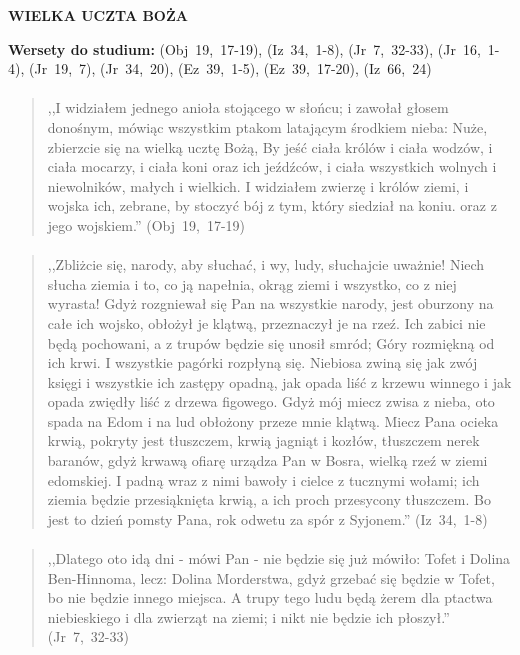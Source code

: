 \documentclass[10pt,a4paper,oneside]{article}
\begin{document}
\centerline{\textbf{\MakeUppercase{Wielka uczta Boża}}}
\begin{center}
\textbf{Wersety do studium:} 
\mbox{(Obj 19, 17-19)}, \mbox{(Iz 34, 1-8)}, \mbox{(Jr 7, 32-33)}, \mbox{(Jr 16, 1-4)}, \mbox{(Jr 19, 7)}, \mbox{(Jr 34, 20)}, \mbox{(Ez 39, 1-5)}, \mbox{(Ez 39, 17-20)}, \mbox{(Iz 66, 24)}
\end{center}
\paragraph{}
\begin{quote}
,,I widziałem jednego anioła stojącego w słońcu; i zawołał głosem donośnym, mówiąc wszystkim ptakom latającym środkiem nieba: Nuże, zbierzcie się na wielką ucztę Bożą, By jeść ciała królów i ciała wodzów, i ciała mocarzy, i ciała koni oraz ich jeźdźców, i ciała wszystkich wolnych i niewolników, małych i wielkich. I widziałem zwierzę i królów ziemi, i wojska ich, zebrane, by stoczyć bój z tym, który siedział na koniu. oraz z jego wojskiem.'' \mbox{(Obj 19, 17-19)}
\end{quote}
\paragraph{}
\begin{quote}
,,Zbliżcie się, narody, aby słuchać, i wy, ludy, słuchajcie uważnie! Niech słucha ziemia i to, co ją napełnia, okrąg ziemi i wszystko, co z niej wyrasta! Gdyż rozgniewał się Pan na wszystkie narody, jest oburzony na całe ich wojsko, obłożył je klątwą, przeznaczył je na rzeź. Ich zabici nie będą pochowani, a z trupów będzie się unosił smród; Góry rozmiękną od ich krwi. I wszystkie pagórki rozpłyną się. Niebiosa zwiną się jak zwój księgi i wszystkie ich zastępy opadną, jak opada liść z krzewu winnego i jak opada zwiędły liść z drzewa figowego. Gdyż mój miecz zwisa z nieba, oto spada na Edom i na lud obłożony przeze mnie klątwą. Miecz Pana ocieka krwią, pokryty jest tłuszczem, krwią jagniąt i kozłów, tłuszczem nerek baranów, gdyż krwawą ofiarę urządza Pan w Bosra, wielką rzeź w ziemi edomskiej. I padną wraz z nimi bawoły i cielce z tucznymi wołami; ich ziemia będzie przesiąknięta krwią, a ich proch przesycony tłuszczem. Bo jest to dzień pomsty Pana, rok odwetu za spór z Syjonem.'' \mbox{(Iz 34, 1-8)}
\end{quote}
\paragraph{}
\begin{quote}
,,Dlatego oto idą dni - mówi Pan - nie będzie się już mówiło: Tofet i Dolina Ben-Hinnoma, lecz: Dolina Morderstwa, gdyż grzebać się będzie w Tofet, bo nie będzie innego miejsca. A trupy tego ludu będą żerem dla ptactwa niebieskiego i dla zwierząt na ziemi; i nikt nie będzie ich płoszył.'' \mbox{(Jr 7, 32-33)}
\end{quote}
\end{document}
